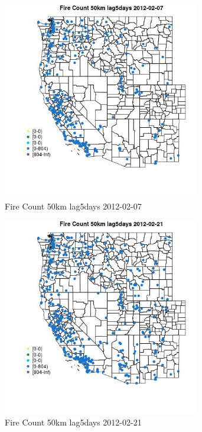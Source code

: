 \begin{figure} 
\centering  
\includegraphics[width=0.77\textwidth]{Code_Outputs/Report_ML_input_PM25_Step4_part_f_de_duplicated_aveswNAs_MapObsFire_Count_50km_lag5days2012-02-07.jpg} 
\caption{\label{fig:Report_ML_input_PM25_Step4_part_f_de_duplicated_aveswNAsMapObsFire_Count_50km_lag5days2012-02-07}Fire Count 50km lag5days 2012-02-07} 
\end{figure} 
 

\begin{figure} 
\centering  
\includegraphics[width=0.77\textwidth]{Code_Outputs/Report_ML_input_PM25_Step4_part_f_de_duplicated_aveswNAs_MapObsFire_Count_50km_lag5days2012-02-21.jpg} 
\caption{\label{fig:Report_ML_input_PM25_Step4_part_f_de_duplicated_aveswNAsMapObsFire_Count_50km_lag5days2012-02-21}Fire Count 50km lag5days 2012-02-21} 
\end{figure} 
 

